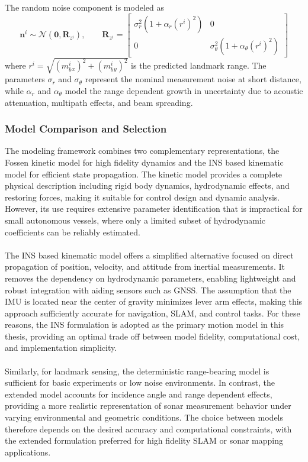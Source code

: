 \\ \\
The random noise component is modeled as
\begin{equation}
    \mathbf{n}^i \sim \mathcal{N}(\mathbf{0}, \mathbf{R}_{z^i}),
    \qquad
    \mathbf{R}_{z^i} =
    \begin{bmatrix}
        \sigma_r^2(1 + \alpha_r (r^i)^2) & 0 \\
        0 & \sigma_\theta^2(1 + \alpha_\theta (r^i)^2)
    \end{bmatrix}
    \label{eq:range-bearing-model-extended-noise}
\end{equation}
where $r^i = \sqrt{(m_b^i{}_x)^2 + (m_b^i{}_y)^2}$ is the predicted landmark range. The parameters $\sigma_r$ and $\sigma_\theta$ represent the nominal measurement noise at short distance, while $\alpha_r$ and $\alpha_\theta$ model the range dependent growth in uncertainty due to acoustic attenuation, multipath effects, and beam spreading.  



\subsubsection{Model Comparison and Selection}
The modeling framework combines two complementary representations, the Fossen kinetic model for high fidelity dynamics and the INS based kinematic model for efficient state propagation. The kinetic model provides a complete physical description including rigid body dynamics, hydrodynamic effects, and restoring forces, making it suitable for control design and dynamic analysis. However, its use requires extensive parameter identification that is impractical for small autonomous vessels, where only a limited subset of hydrodynamic coefficients can be reliably estimated.  
\\ \\
The INS based kinematic model offers a simplified alternative focused on direct propagation of position, velocity, and attitude from inertial measurements. It removes the dependency on hydrodynamic parameters, enabling lightweight and robust integration with aiding sensors such as GNSS. The assumption that the IMU is located near the center of gravity minimizes lever arm effects, making this approach sufficiently accurate for navigation, SLAM, and control tasks. For these reasons, the INS formulation is adopted as the primary motion model in this thesis, providing an optimal trade off between model fidelity, computational cost, and implementation simplicity.  
\\ \\
Similarly, for landmark sensing, the deterministic range-bearing model is sufficient for basic experiments or low noise environments. In contrast, the extended model accounts for incidence angle and range dependent effects, providing a more realistic representation of sonar measurement behavior under varying environmental and geometric conditions. The choice between models therefore depends on the desired accuracy and computational constraints, with the extended formulation preferred for high fidelity SLAM or sonar mapping applications.

